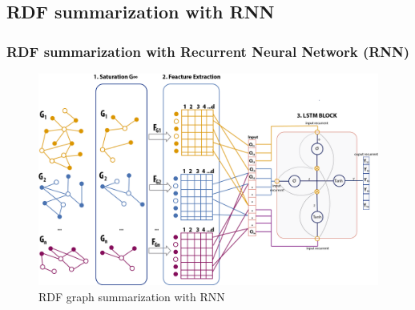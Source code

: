 \documentclass{beamer}
\numberwithin{figure}{section}
\numberwithin{equation}{section}
\begin{document}
\subsection{RDF summarization with RNN}
\begin{frame}
 \frametitle{RDF summarization with Recurrent Neural Network (RNN)}
 
 	\begin{figure}[p]
  		\centering
  		\includegraphics[width=1.0\linewidth]{pictures/ModeloRDF_RNN}
  		\caption{\scriptsize RDF graph summarization with RNN}
  		\label{fig:RDFRNN}
 	\end{figure}
 
\end{frame}
\end{document}
